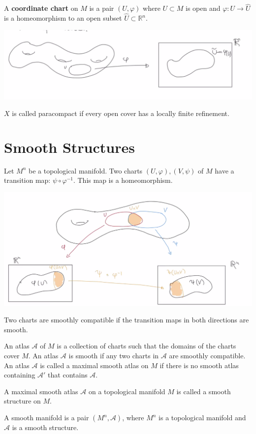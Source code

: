 \documentclass[12pt]{scrartcl}
\newcommand{\R}{\mathbb{R}}
\renewcommand{\hat}{\widehat}
\let \phi \varphi
\let \mc \mathcal
\begin{document}
\begin{definition} A \textbf{coordinate chart} on $M$ is a pair $(U, \phi)$ where $U\subset M$ is open and $\phi: U \to \hat{U} $ is a homeomorphism to an open subset $\hat{U} \subset \R^n$.
\end{definition}

\includegraphics[scale=0.5]{chart.png}

\begin{definition} $X$ is called paracompact if every open cover has a locally finite refinement. 
\end{definition}

\section{Smooth Structures}
\begin{definition} Let $M^n$ be a topological manifold.  Two charts $(U, \phi), (V, \psi)$ of $M$ have a transition map: $\psi \circ \phi^{-1}$.  This map is a homeomorphism.
\end{definition}
\includegraphics[scale=0.5]{transition}
\begin{definition} Two charts are smoothly compatible if the transition maps in both directions are smooth.
\end{definition}
\begin{definition} An atlas $\mc A$ of $M$ is a collection of charts such that the domains of the charts cover $M$.  An atlas $\mc A$ is smooth if any two charts in $\mc A$ are smoothly compatible.  An atlas $\mc A$ is called a maximal smooth atlas on $M$ if there is no smooth atlas containing $\mc A'$ that contains $\mc A$.  
\end{definition}
\begin{definition} A maximal smooth atlas $\mc A$ on a topological manifold $M$ is called a smooth structure on $M$.
\end{definition}
\begin{definition} A smooth manifold is a pair $(M^n, \mc A)$, where $M^n$ is a topological manifold and $\mc A$ is a smooth structure.  
\end{definition}
\end{document}
